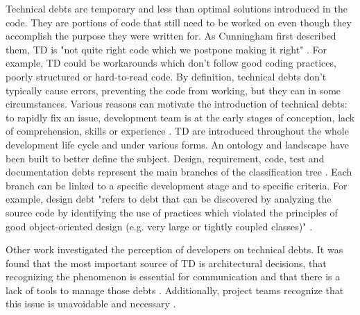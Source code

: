 \setlength{\parindent}{5ex} Technical debts are temporary and less than optimal solutions introduced in the code. They are portions of code that still need to be worked on even though they accomplish the purpose they were written for. As Cunningham first described them, \ac{TD} is "not quite right code which we postpone making it right" \citep{Cunningham:1992:WPM:157709.157715}. For example, \ac{TD} could be workarounds which don't follow good coding practices, poorly structured or hard-to-read code. By definition, technical debts don't typically cause errors, preventing the code from working, but they can in some circumstances. Various reasons can motivate the introduction of technical debts: to rapidly fix an issue, development team is at the early stages of conception, lack of comprehension, skills or experience \citep{Suryanarayana20151}. \ac{TD} are introduced throughout the whole development life cycle and under various forms. An ontology and landscape have been built to better define the subject. Design, requirement, code, test and documentation debts represent the main branches of the classification tree \citep{alves2014towards,izurieta2012organizing}. Each branch can be linked to a specific development stage and to specific criteria. For example, design debt "refers to debt that can be discovered by analyzing the source code by identifying the use of practices which violated the principles of good object-oriented design (e.g. very large or tightly coupled classes)" \citep{alves2014towards}. \par

Other work investigated the perception of developers on technical debts. It was found that the most important source of \ac{TD} is architectural decisions, that recognizing the phenomenon is essential for communication and that there is a lack of tools to manage those debts \citep{Ernst:2015:MMI:2786805.2786848}. Additionally, project teams recognize that this issue is unavoidable and necessary \citep{lim2012balancing}.


%	
%	
%	
%	
%	
		


